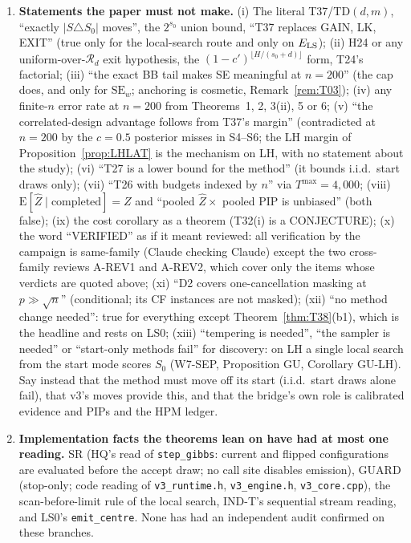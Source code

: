 \documentclass[11pt]{article}
\theoremstyle{definition}
\theoremstyle{remark}
\newcommand{\E}{\mathrm{E}}
\newcommand{\Sz}{S_0}
\newcommand{\Zh}{\widehat Z}
\newcommand{\cR}{\mathcal R}
\begin{document}
\begin{enumerate}
\item[8.] \textbf{Statements the paper must not make.}
(i) The literal T37/$\mathrm{TD}(d,m)$, ``exactly $|S\triangle\Sz|$ moves'', the $2^{s_0}$ union bound, ``T37 replaces GAIN, LK, EXIT'' (true only for the local-search route and only on $E_{\rm LS}$); (ii) H24 or any uniform-over-$\cR_d$ exit hypothesis, the $(1-c')^{\lfloor H/(s_0+d)\rfloor}$ form, T24's factorial; (iii) ``the exact BB tail makes SE meaningful at $n=200$'' (the cap does, and only for $\mathrm{SE}_w$; anchoring is cosmetic, Remark~\ref{rem:T03}); (iv) any finite-$n$ error rate at $n=200$ from Theorems~1, 2, 3(ii), 5 or 6; (v) ``the correlated-design advantage follows from T37's margin'' (contradicted at $n=200$ by the $c=0.5$ posterior misses in S4--S6; the LH margin of Proposition~\ref{prop:LHLAT} is the mechanism on LH, with no statement about the study); (vi) ``T27 is a lower bound for the method'' (it bounds i.i.d.\ start draws only); (vii) ``T26 with budgets indexed by $n$'' via $T^{\max}=4{,}000$; (viii) $\E[\Zh\mid\text{completed}]=Z$ and ``pooled $\Zh\times$ pooled PIP is unbiased'' (both false); (ix) the cost corollary as a theorem (T32(i) is a CONJECTURE); (x) the word ``VERIFIED'' as if it meant reviewed: all verification by the campaign is same-family (Claude checking Claude) except the two cross-family reviews A-REV1 and A-REV2, which cover only the items whose verdicts are quoted above; (xi) ``D2 covers one-cancellation masking at $p\gg\sqrt n$'' (conditional; its CF instances are not masked); (xii) ``no method change needed'': true for everything except Theorem~\ref{thm:T38}(b1), which is the headline and rests on LS0; (xiii) ``tempering is needed'', ``the sampler is needed'' or ``start-only methods fail'' for discovery: on LH a single local search from the start mode scores $\Sz$ (W7-SEP, Proposition GU, Corollary GU-LH). Say instead that the method must move off its start (i.i.d.\ start draws alone fail), that v3's moves provide this, and that the bridge's own role is calibrated evidence and PIPs and the HPM ledger.

\item[9.] \textbf{Implementation facts the theorems lean on have had at most one reading.}
SR (HQ's read of \texttt{step\_gibbs}: current and flipped configurations are evaluated before the accept draw; no call site disables emission), GUARD (stop-only; code reading of \texttt{v3\_runtime.h}, \texttt{v3\_engine.h}, \texttt{v3\_core.cpp}), the scan-before-limit rule of the local search, IND-T's sequential stream reading, and LS0's \texttt{emit\_centre}. None has had an independent audit confirmed on these branches.
\end{enumerate}
\end{document}

